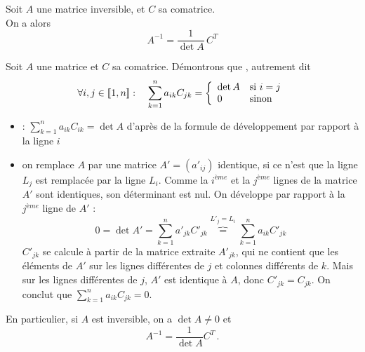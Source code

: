 \documentclass{book}
\begin{document}
\begin{Theoreme}
Soit $A$ une matrice inversible, et $C$ sa comatrice.\\
On a alors
$$ A^{-1} = \frac{1}{\det A} \, C^T$$
\end{Theoreme}
\begin{Demonstration}
Soit $A$ une matrice et $C$ sa comatrice.
Démontrons que  , autrement dit
$$
\forall i,j\in\mathopen\lbrack\!\lbrack1,n \mathclose\rbrack\!\rbrack:\quad \sum_{k=1}^{n} a_{ik} C_{jk} =
\left\{ \begin{array}{ll} \mathop{\mathrm{det}}\nolimits A & \text{si } i=j \\ 0 & \text{sinon}\end{array} \right.
$$
\begin{itemize}
\item {} :  $\sum_{k=1}^{n} a_{ik} C_{ik}=\det A$ d'après de la formule de développement par rapport à la ligne $i$
\item {} on remplace $A$ par une matrice $A'=(a'_{ij})$ identique,
si ce n'est que la ligne $L_j$ est remplacée par la ligne $L_i$.  Comme la $i^{ème}$ et la $j^{ème}$ lignes de la matrice $A'$ sont identiques, son déterminant est nul. 
On développe par rapport à la $j^{ème}$ ligne de $A'$ :
$$
0 = \det A' = \sum_{k=1}^n a'_{jk} C'_{jk} \overbrace{=}^{L'_j=L_i} \sum_{k=1}^n a_{ik} C'_{jk}
$$
$C'_{jk}$ se calcule à partir de la matrice extraite $A'_{jk}$, qui ne contient que les éléments
de $A'$ sur les lignes différentes de $j$ et colonnes différents de $k$. Mais sur les lignes
différentes de $j$, $A'$ est identique à $A$, donc $C'_{jk} = C_{jk}$. On conclut que
$\sum_{k=1}^n a_{ik} C_{jk} = 0$.

   
\end{itemize}
En particulier, si $A$ est inversible,  on a $\det A \neq 0$ et
$$
A^{-1} = \frac{1}{\det A} C^T\, .
$$
\end{Demonstration}
\end{document}
